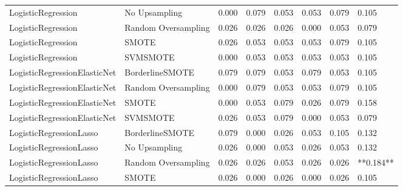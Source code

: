 \begin{tabular}{llllllll}
          LogisticRegression &       No Upsampling & 0.000 &                     0.079 &                 0.053 &                  0.053 &                                   0.079 &     0.105 \\
          LogisticRegression & Random Oversampling & 0.026 &                     0.026 &                 0.026 &                  0.000 &                                   0.053 &     0.079 \\
          LogisticRegression &               SMOTE & 0.026 &                     0.053 &                 0.053 &                  0.053 &                                   0.079 &     0.105 \\
          LogisticRegression &            SVMSMOTE & 0.000 &                     0.053 &                 0.053 &                  0.053 &                                   0.053 &     0.105 \\
LogisticRegressionElasticNet &     BorderlineSMOTE & 0.079 &                     0.079 &                 0.053 &                  0.079 &                                   0.053 &     0.105 \\
LogisticRegressionElasticNet & Random Oversampling & 0.000 &                     0.079 &                 0.053 &                  0.053 &                                   0.079 &     0.105 \\
LogisticRegressionElasticNet &               SMOTE & 0.000 &                     0.053 &                 0.079 &                  0.026 &                                   0.079 &     0.158 \\
LogisticRegressionElasticNet &            SVMSMOTE & 0.026 &                     0.053 &                 0.079 &                  0.000 &                                   0.053 &     0.079 \\
     LogisticRegressionLasso &     BorderlineSMOTE & 0.079 &                     0.000 &                 0.026 &                  0.053 &                                   0.105 &     0.132 \\
     LogisticRegressionLasso &       No Upsampling & 0.026 &                     0.000 &                 0.053 &                  0.026 &                                   0.053 &     0.132 \\
     LogisticRegressionLasso & Random Oversampling & 0.026 &                     0.026 &                 0.053 &                  0.026 &                                   0.026 & **0.184** \\
     LogisticRegressionLasso &               SMOTE & 0.026 &                     0.000 &                 0.026 &                  0.000 &                                   0.026 &     0.105 \\

\end{tabular}
